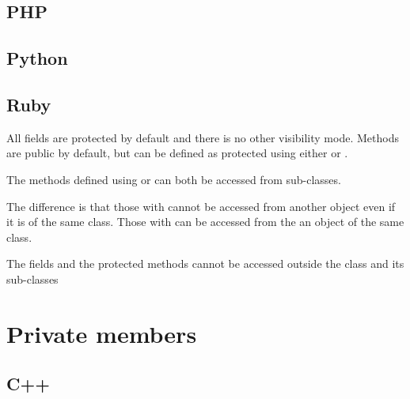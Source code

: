 \documentclass{KodeBook}
\begin{document}
\subsection{PHP}

%

\subsection{Python}

%

\subsection{Ruby}

All fields are protected by default and there is no other visibility mode. 
Methods are public by default, but can be defined as protected using either  or . 



The methods defined using  or  can both be accessed from sub-classes.



The difference is that those with  cannot be accessed from another object even if it is of the same class. 
Those with  can be accessed from the an object of the same class.



The fields and the protected methods cannot be accessed outside the class and its sub-classes



\section{Private members}

\subsection{C++}
\end{document}
